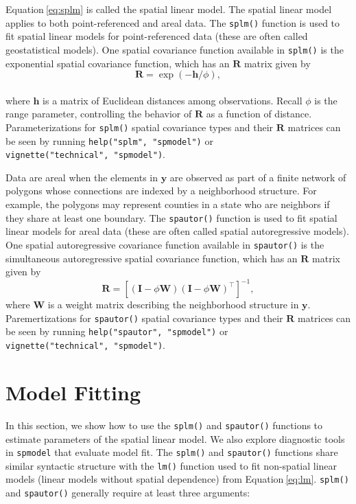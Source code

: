 \documentclass{article}
\begin{document}
Equation\(~\)\ref{eq:splm} is called the spatial linear model. The
spatial linear model applies to both point-referenced and areal data.
The \texttt{splm()} function is used to fit spatial linear models for
point-referenced data (these are often called geostatistical models).
One spatial covariance function available in \texttt{splm()} is the
exponential spatial covariance function, which has an \(\mathbf{R}\)
matrix given by \begin{equation*}
  \mathbf{R} = \exp(-\mathbf{h} / \phi),
\end{equation*}\\
where \(\mathbf{h}\) is a matrix of Euclidean distances among
observations. Recall \(\phi\) is the range parameter, controlling the
behavior of \(\mathbf{R}\) as a function of distance. Parameterizations
for \texttt{splm()} spatial covariance types and their \(\mathbf{R}\)
matrices can be seen by running \texttt{help("splm",\ "spmodel")} or
\texttt{vignette("technical",\ "spmodel")}.

Data are areal when the elements in \(\mathbf{y}\) are observed as part
of a finite network of polygons whose connections are indexed by a
neighborhood structure. For example, the polygons may represent counties
in a state who are neighbors if they share at least one boundary. The
\texttt{spautor()} function is used to fit spatial linear models for
areal data (these are often called spatial autoregressive models). One
spatial autoregressive covariance function available in
\texttt{spautor()} is the simultaneous autoregressive spatial covariance
function, which has an \(\mathbf{R}\) matrix given by \begin{equation*}
  \mathbf{R} = [(\mathbf{I} - \phi \mathbf{W})(\mathbf{I} - \phi \mathbf{W})^\top]^{-1},
\end{equation*} where \(\mathbf{W}\) is a weight matrix describing the
neighborhood structure in \(\mathbf{y}\). Paremertizations for
\texttt{spautor()} spatial covariance types and their \(\mathbf{R}\)
matrices can be seen by running \texttt{help("spautor",\ "spmodel")} or
\texttt{vignette("technical",\ "spmodel")}.

\hypertarget{sec:modelfit}{%
\section{Model Fitting}\label{sec:modelfit}}

In this section, we show how to use the \texttt{splm()} and
\texttt{spautor()} functions to estimate parameters of the spatial
linear model. We also explore diagnostic tools in \texttt{spmodel} that
evaluate model fit. The \texttt{splm()} and \texttt{spautor()} functions
share similar syntactic structure with the \texttt{lm()} function used
to fit non-spatial linear models (linear models without spatial
dependence) from Equation\(~\)\ref{eq:lm}. \texttt{splm()} and
\texttt{spautor()} generally require at least three arguments:
\end{document}
